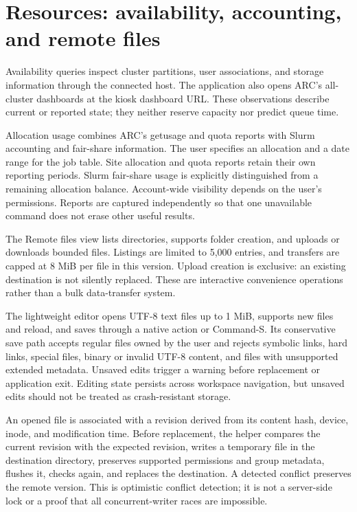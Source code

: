 \documentclass[manuscript,screen,nonacm]{acmart}
\begin{document}
\section{Resources: availability, accounting, and remote files}

Availability queries inspect cluster partitions, user associations, and storage information through the connected host. The application also opens ARC's all-cluster dashboards at the kiosk dashboard URL. These observations describe current or reported state; they neither reserve capacity nor predict queue time.

Allocation usage combines ARC's getusage and quota reports with Slurm accounting and fair-share information. The user specifies an allocation and a date range for the job table. Site allocation and quota reports retain their own reporting periods. Slurm fair-share usage is explicitly distinguished from a remaining allocation balance. Account-wide visibility depends on the user's permissions. Reports are captured independently so that one unavailable command does not erase other useful results.

The Remote files view lists directories, supports folder creation, and uploads or downloads bounded files. Listings are limited to 5,000 entries, and transfers are capped at 8 MiB per file in this version. Upload creation is exclusive: an existing destination is not silently replaced. These are interactive convenience operations rather than a bulk data-transfer system.

The lightweight editor opens UTF-8 text files up to 1 MiB, supports new files and reload, and saves through a native action or Command-S. Its conservative save path accepts regular files owned by the user and rejects symbolic links, hard links, special files, binary or invalid UTF-8 content, and files with unsupported extended metadata. Unsaved edits trigger a warning before replacement or application exit. Editing state persists across workspace navigation, but unsaved edits should not be treated as crash-resistant storage.

An opened file is associated with a revision derived from its content hash, device, inode, and modification time. Before replacement, the helper compares the current revision with the expected revision, writes a temporary file in the destination directory, preserves supported permissions and group metadata, flushes it, checks again, and replaces the destination. A detected conflict preserves the remote version. This is optimistic conflict detection; it is not a server-side lock or a proof that all concurrent-writer races are impossible.
\end{document}
